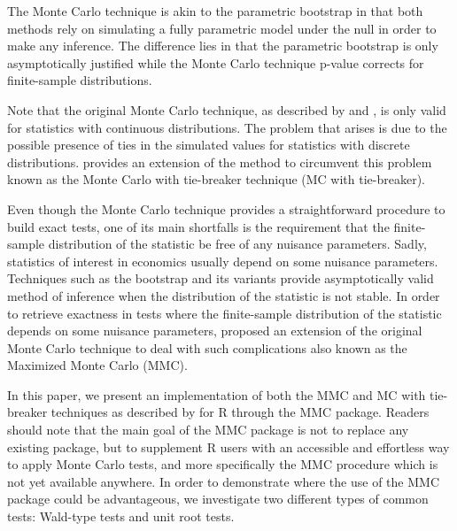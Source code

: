 \documentclass[11pt]{article}\usepackage[]{graphicx}\usepackage[]{color}
\newcommand{\pkg}[1]{{\normalfont\fontseries{b}\selectfont #1}}
\let\proglang=\textsf
\begin{document}
The Monte Carlo technique is akin to the parametric bootstrap in that both methods rely on simulating a fully parametric model under the null in order to make any inference. The difference lies in that the parametric bootstrap is only asymptotically justified while the Monte Carlo technique p-value corrects for finite-sample distributions.

Note that the original Monte Carlo technique, as described by \cite{dwass_modified_1957} and \cite{barnard_comment_1963}, is only valid for statistics with continuous distributions. The problem that arises is due to the possible presence of ties in the simulated values for statistics with discrete distributions. \cite{dufour_monte_2006} provides an extension of the method to circumvent this problem known as the Monte Carlo with tie-breaker technique (MC with tie-breaker).

Even though the Monte Carlo technique provides a straightforward procedure to build exact tests, one of its main shortfalls is the requirement that the finite-sample distribution of the statistic be free of any nuisance parameters. Sadly, statistics of interest in economics usually depend on some nuisance parameters. Techniques such as the bootstrap and its variants provide asymptotically valid method of inference when the distribution of the statistic is not stable. In order to retrieve exactness in tests where the finite-sample distribution of the statistic depends on some nuisance parameters, \cite{dufour_monte_2006} proposed an extension of the original Monte Carlo technique to deal with such complications also known as the Maximized Monte Carlo (MMC).

In this paper, we present an implementation of both the MMC and MC with tie-breaker techniques as described by \cite{dufour_monte_2006} for \proglang{R} through the \pkg{MMC} package. Readers should note that the main goal of the \pkg{MMC} package is not to replace any existing package, but to supplement \proglang{R} users with an accessible and effortless way to apply Monte Carlo tests, and more specifically the MMC procedure which is not yet available anywhere. In order to demonstrate where the use of the \pkg{MMC} package could be advantageous, we investigate two different types of common tests: Wald-type tests and unit root tests.
\end{document}
